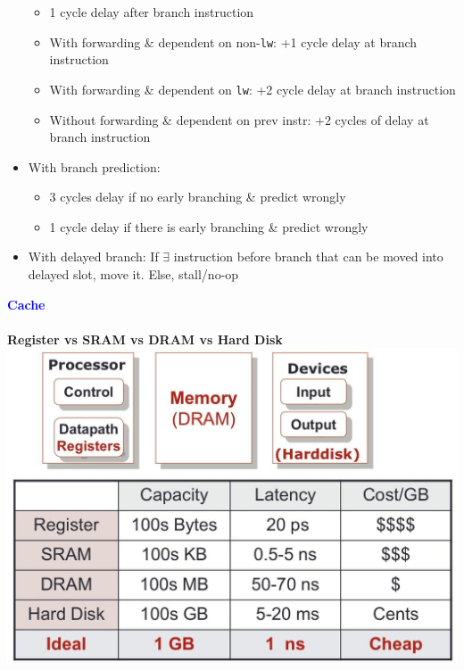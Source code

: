 \documentclass[a4paper]{article} \usepackage[backend=biber, style=numeric, sorting=none]{biblatex}
\begin{document}
\begin{multicols*}{4}
\begin{itemize}
        \begin{itemize}
            \item 1 cycle delay after branch instruction
            \item With forwarding \& dependent on non-\texttt{lw}: +1 cycle delay at branch instruction
            \item With forwarding \& dependent on \texttt{lw}: +2 cycle delay at branch instruction
            \item Without forwarding \& dependent on prev instr: +2 cycles of delay at branch instruction
        \end{itemize}
    \item With branch prediction:
        \begin{itemize}
            \item 3 cycles delay if no early branching \& predict wrongly
            \item 1 cycle delay if there is early branching \& predict wrongly
        \end{itemize}
    \item With delayed branch: If $\exists$ instruction before branch that can be moved into delayed slot, move it. Else, stall/no-op\\
\end{itemize}

{\small\textbf{\textcolor{blue}{Cache\\}}}
\\\textbf{Register vs SRAM vs DRAM vs Hard Disk\\}
\includegraphics[width=\columnwidth]{storage}


\end{multicols*}
\end{document}
